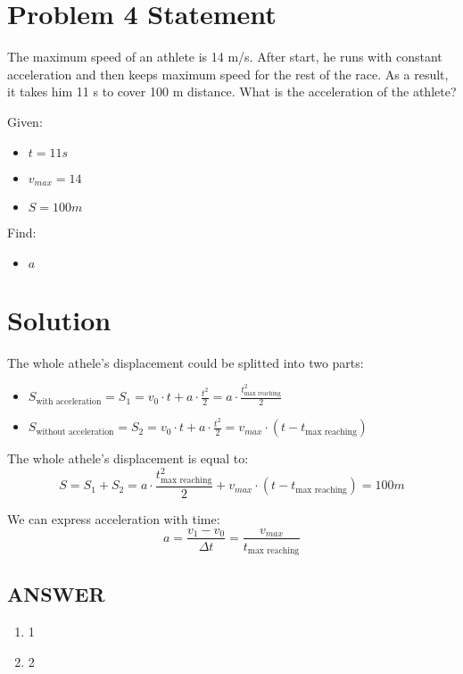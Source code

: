 \section*{Problem 4 Statement}

The maximum speed of an athlete is 14 m/s. After start, he runs with constant acceleration and
then keeps maximum speed for the rest of the race. As a result, it takes him 11 s to cover 100 m
distance. What is the acceleration of the athlete?

\bigbreak Given:

\begin{itemize}
    \item $t = 11s$
    \item $v_{max} = 14$
    \item $S = 100m$
\end{itemize}

\bigbreak Find:

\begin{itemize}
    \item $a$
\end{itemize}

\section*{Solution}

The whole athele's displacement could be splitted into two parts:

\begin{itemize}
    \item $S_{\text{with acceleration}} = S_1 = v_0 \cdot t + a \cdot \frac{t^2}{2} = a \cdot \frac{t_{\text{max reaching}}^2}{2}$
    \item $ S_{\text{without acceleration}} = S_2 = v_0 \cdot t + a \cdot \frac{t^2}{2} = v_{max} \cdot (t - t_{\text{max reaching}})$
\end{itemize}

The whole athele's displacement is equal to:
$$ S = S_1 + S_2 = a \cdot \frac{t_{\text{max reaching}}^2}{2} + v_{max} \cdot (t - t_{\text{max reaching}}) = 100m $$

We can express acceleration with time:
$$a = \frac{v_1 - v_0}{\Delta t} = \frac{v_{max}}{t_{\text{max reaching}}}$$

\vfill \subsection*{ANSWER}
\begin{enumerate}
    \item 1
    \item 2
\end{enumerate}

